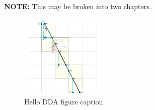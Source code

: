 \textbf{NOTE:} This may be broken into two chapters.
\begin{figure}
    \centering
    \includegraphics[width=4cm]{DDA.png}
    \caption{Hello DDA figure caption}\label{fig:DDA}
\end{figure}
\endinput
